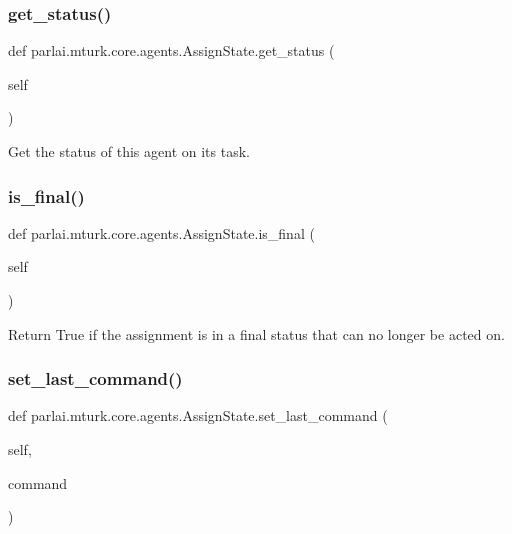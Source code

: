 \subsubsection{\texorpdfstring{get\+\_\+status()}{get\_status()}}
{\footnotesize\ttfamily def parlai.\+mturk.\+core.\+agents.\+Assign\+State.\+get\+\_\+status (\begin{DoxyParamCaption}\item[{}]{self }\end{DoxyParamCaption})}

\begin{DoxyVerb}Get the status of this agent on its task.
\end{DoxyVerb}
 \mbox{\label{classparlai_1_1mturk_1_1core_1_1agents_1_1AssignState_a95b2a76b6e8ec7e045542450ee49f971}} 
\subsubsection{\texorpdfstring{is\+\_\+final()}{is\_final()}}
{\footnotesize\ttfamily def parlai.\+mturk.\+core.\+agents.\+Assign\+State.\+is\+\_\+final (\begin{DoxyParamCaption}\item[{}]{self }\end{DoxyParamCaption})}

\begin{DoxyVerb}Return True if the assignment is in a final status that can no longer be acted
on.
\end{DoxyVerb}
 \mbox{\label{classparlai_1_1mturk_1_1core_1_1agents_1_1AssignState_a6251191f5a8d16778dc56e21564ede79}} 
\subsubsection{\texorpdfstring{set\+\_\+last\+\_\+command()}{set\_last\_command()}}
{\footnotesize\ttfamily def parlai.\+mturk.\+core.\+agents.\+Assign\+State.\+set\+\_\+last\+\_\+command (\begin{DoxyParamCaption}\item[{}]{self,  }\item[{}]{command }\end{DoxyParamCaption})}

